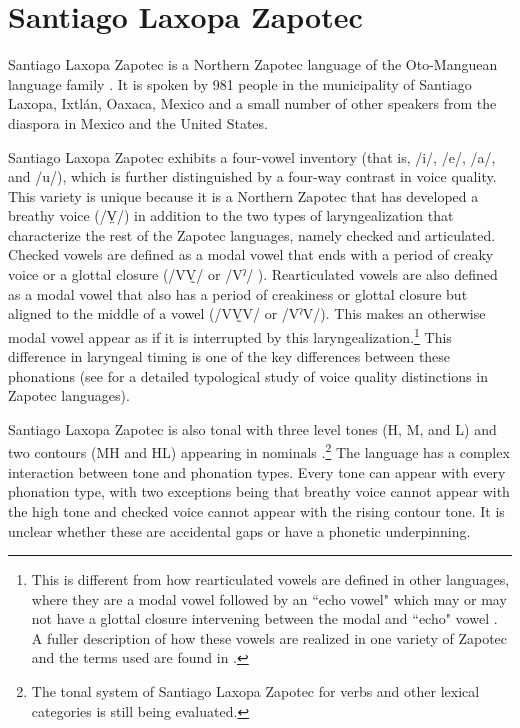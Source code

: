 \section{Santiago Laxopa Zapotec} \label{sec:SLZ}
Santiago Laxopa Zapotec is a Northern Zapotec language of the Oto-Manguean language family \citep{adlerAcousticsPhonationTypes2016,adlerDerivationVerbInitiality2018,foleyForbiddenCliticClusters2018,foleyExtendingPersonCaseConstraint2020,sichelPronounsAttractionSierra2020,
sichelFeaturalLifeNominals2020,brinkerhoffDownstepSantiagoLaxopaMFM,brinkerhoffTonalPatternsTheir2022}. It is spoken by 981 people in the municipality of Santiago Laxopa, Ixtlán, Oaxaca, Mexico and a small number of other speakers from the diaspora in Mexico and the United States. 

Santiago Laxopa Zapotec exhibits a four-vowel inventory (that is, /i/, /e/, /a/, and /u/), which is further distinguished by a four-way contrast in voice quality. This variety is unique because it is a Northern Zapotec that has developed a breathy voice (/V̤/) in addition to the two types of laryngealization that characterize the rest of the Zapotec languages, namely checked and articulated. Checked vowels are defined as a modal vowel that ends with a period of creaky voice or a glottal closure (/VV̰/ or /Vˀ/ ). Rearticulated vowels are also defined as a modal vowel that also has a period of creakiness or glottal closure but aligned to the middle of a vowel (/VV̰V/ or /VˀV/). This makes an otherwise modal vowel appear as if it is interrupted by this laryngealization.\footnote{This is different from how rearticulated vowels are defined in other languages, where they are a modal vowel followed by an ``echo vowel" which may or may not have a glottal closure intervening between the modal and ``echo" vowel \citep[see][]{bairdPhoneticPhonologicalRealizations2011}. A fuller description of how these vowels are realized in one variety of Zapotec and the terms used are found in \citet{avelinoAcousticElectroglottographicAnalyses2010}.} This difference in laryngeal timing is one of the key differences between these phonations (see \cite{ariza-garciaPhonationTypesTones2018} for a detailed typological study of voice quality distinctions in Zapotec languages).

Santiago Laxopa Zapotec is also tonal with three level tones (H, M, and L) and two contours (MH and HL) appearing in nominals \citep{brinkerhoffTonalPatternsTheir2022}.\footnote{The tonal system of Santiago Laxopa Zapotec for verbs and other lexical categories is still being evaluated.} The language has a complex interaction between tone and phonation types. Every tone can appear with every phonation type, with two exceptions being that breathy voice cannot appear with the high tone and checked voice cannot appear with the rising contour tone. It is unclear whether these are accidental gaps or have a phonetic underpinning.

